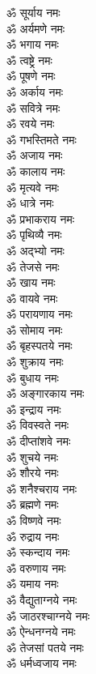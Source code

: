 \begin{multicols}{2}
\begin{flushleft}
ॐ सूर्याय नमः\\
ॐ अर्यमणे नमः\\
ॐ भगाय नमः\\
ॐ त्वष्ट्रे नमः\\
ॐ पूषणे नमः\\
ॐ अर्काय नमः\\
ॐ सवित्रे नमः\\
ॐ रवये नमः\\
ॐ गभस्तिमते नमः\\
ॐ अजाय नमः\hfill{}\\
ॐ कालाय नमः\\
ॐ मृत्यवे नमः\\
ॐ धात्रे नमः\\
ॐ प्रभाकराय नमः\\
ॐ पृथिव्यै नमः\\
ॐ अद्भ्यो नमः\\
ॐ तेजसे नमः\\
ॐ खाय नमः\\
ॐ वायवे नमः\\
ॐ परायणाय नमः\hfill{}\\
ॐ सोमाय नमः\\
ॐ बृहस्पतये नमः\\
ॐ शुक्राय नमः\\
ॐ बुधाय नमः\\
ॐ अङ्गारकाय नमः\\
ॐ इन्द्राय नमः\\
ॐ विवस्वते नमः\\
ॐ दीप्तांशवे नमः\\
ॐ शुचये नमः\\
ॐ शौरये नमः\hfill{}\\
ॐ शनैश्चराय नमः\\
ॐ ब्रह्मणे नमः\\
ॐ विष्णवे नमः\\
ॐ रुद्राय नमः\\
ॐ स्कन्दाय नमः\\
ॐ वरुणाय नमः\\
ॐ यमाय नमः\\
ॐ वैद्युताग्नये नमः\\
ॐ जाठरश्चाग्नये नमः\\
ॐ ऐन्धनग्नये नमः\hfill{}\\
ॐ तेजसां पतये नमः\\
ॐ धर्मध्वजाय नमः\\

\end{flushleft}
\end{multicols}
